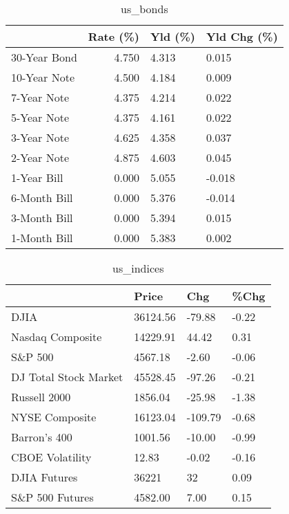 \documentclass{article}%
\begin{document}
%


\begin{table}[htbp]%
\caption{us\_bonds}%
\centering%
\begin{adjustbox}{width=1\textwidth}%
\begin{tabular}{lrll}
\toprule
             &  Rate (\%) & Yld (\%) & Yld Chg (\%) \\
\midrule
30-Year Bond &     4.750 &   4.313 &       0.015 \\
10-Year Note &     4.500 &   4.184 &       0.009 \\
 7-Year Note &     4.375 &   4.214 &       0.022 \\
 5-Year Note &     4.375 &   4.161 &       0.022 \\
 3-Year Note &     4.625 &   4.358 &       0.037 \\
 2-Year Note &     4.875 &   4.603 &       0.045 \\
 1-Year Bill &     0.000 &   5.055 &      -0.018 \\
6-Month Bill &     0.000 &   5.376 &      -0.014 \\
3-Month Bill &     0.000 &   5.394 &       0.015 \\
1-Month Bill &     0.000 &   5.383 &       0.002 \\
\bottomrule
\end{tabular}
%
\end{adjustbox}%
\end{table}

%


\begin{table}[htbp]%
\caption{us\_indices}%
\centering%
\begin{adjustbox}{width=1\textwidth}%
\begin{tabular}{llll}
\toprule
                      &    Price &     Chg &  \%Chg \\
\midrule
                 DJIA & 36124.56 &  -79.88 & -0.22 \\
     Nasdaq Composite & 14229.91 &   44.42 &  0.31 \\
              S\&P 500 &  4567.18 &   -2.60 & -0.06 \\
DJ Total Stock Market & 45528.45 &  -97.26 & -0.21 \\
         Russell 2000 &  1856.04 &  -25.98 & -1.38 \\
       NYSE Composite & 16123.04 & -109.79 & -0.68 \\
         Barron's 400 &  1001.56 &  -10.00 & -0.99 \\
      CBOE Volatility &    12.83 &   -0.02 & -0.16 \\
         DJIA Futures &    36221 &      32 &  0.09 \\
      S\&P 500 Futures &  4582.00 &    7.00 &  0.15 \\
\bottomrule
\end{tabular}
%
\end{adjustbox}%
\end{table}
\end{document}
